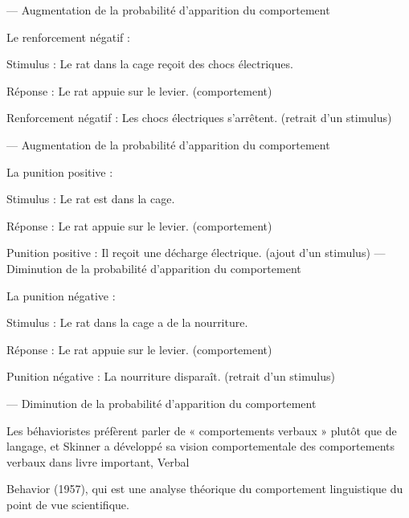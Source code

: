 — Augmentation de la probabilité d’apparition du comportement\par

Le renforcement négatif :\par

Stimulus : Le rat dans la cage reçoit des chocs électriques.\par

Réponse : Le rat appuie sur le levier. (comportement)\par

Renforcement négatif : Les chocs électriques s’arrêtent. (retrait d’un stimulus)\par

— Augmentation de la probabilité d’apparition du comportement\par


La punition positive :\par

Stimulus : Le rat est dans la cage.\par

Réponse : Le rat appuie sur le levier. (comportement)\par

Punition positive : Il reçoit une décharge électrique. (ajout d’un stimulus) — Diminution de la probabilité d’apparition du comportement\par

La punition négative :\par

Stimulus : Le rat dans la cage a de la nourriture.\par

Réponse : Le rat appuie sur le levier. (comportement)\par

Punition négative : La nourriture disparaît. (retrait d’un stimulus)\par

— Diminution de la probabilité d’apparition du comportement\par


Les béhavioristes préfèrent parler de « comportements verbaux » plutôt que de langage, et Skinner a développé sa vision comportementale des comportements verbaux dans livre important, Verbal\par

Behavior (1957), qui est une analyse théorique du comportement linguistique du point de vue scientifique.\par

